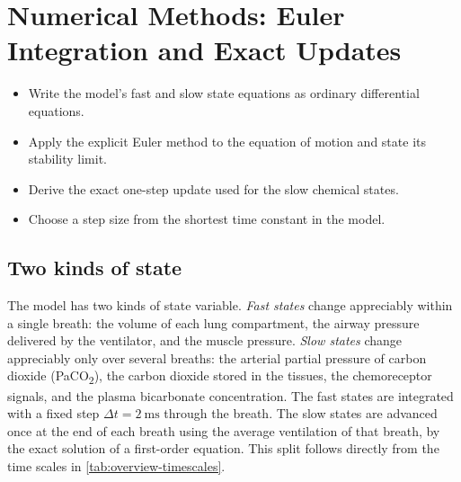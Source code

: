 \chapter{Numerical Methods: Euler Integration and Exact Updates}
\label{ch:ch03}

\begin{objectives}
\begin{itemize}[leftmargin=*]
  \item Write the model's fast and slow state equations as ordinary differential equations.
  \item Apply the explicit Euler method to the equation of motion and state its stability limit.
  \item Derive the exact one-step update used for the slow chemical states.
  \item Choose a step size from the shortest time constant in the model.
\end{itemize}
\end{objectives}

\section{Two kinds of state}
\label{sec:num-states}
The model has two kinds of state variable. \emph{Fast states} change appreciably within a single breath: the volume of each lung compartment, the airway pressure delivered by the ventilator, and the muscle pressure. \emph{Slow states} change appreciably only over several breaths: the arterial partial pressure of carbon dioxide (PaCO\textsubscript{2}), the carbon dioxide stored in the tissues, the chemoreceptor signals, and the plasma bicarbonate concentration. The fast states are integrated with a fixed step $\Delta t = \SI{2}{\milli\second}$ through the breath. The slow states are advanced once at the end of each breath using the average ventilation of that breath, by the exact solution of a first-order equation. This split follows directly from the time scales in \cref{tab:overview-timescales}.

